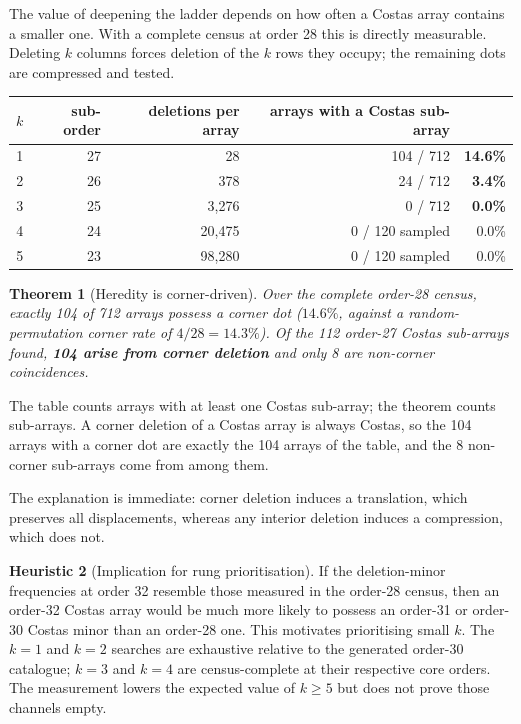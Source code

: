\documentclass[11pt,a4paper,oneside]{report}
\newtheorem{theorem}{Theorem}[chapter]
\theoremstyle{definition}
\newtheorem{heuristic}[theorem]{Heuristic}
\begin{document}
The value of deepening the ladder depends on how often a Costas array contains a
smaller one. With a complete census at order 28 this is directly measurable.
Deleting $k$ columns forces deletion of the $k$ rows they occupy; the remaining
dots are compressed and tested.

\begin{center}
\begin{tabular}{@{}rrrrr@{}}
\toprule
$k$ & sub-order & deletions per array & arrays with a Costas sub-array & \\
\midrule
1 & 27 & 28 & 104 / 712 & \textbf{14.6\%} \\
2 & 26 & 378 & 24 / 712 & \textbf{3.4\%} \\
3 & 25 & 3{,}276 & 0 / 712 & \textbf{0.0\%} \\
4 & 24 & 20{,}475 & 0 / 120 sampled & 0.0\% \\
5 & 23 & 98{,}280 & 0 / 120 sampled & 0.0\% \\
\bottomrule
\end{tabular}
\end{center}

\begin{theorem}[Heredity is corner-driven]
\label{p3-thm:heredity}
Over the complete order-28 census, exactly 104 of 712 arrays possess a corner
dot ($14.6\%$, against a random-permutation corner rate of $4/28 = 14.3\%$). Of
the 112 order-27 Costas sub-arrays found, \textbf{104 arise from corner
deletion} and only 8 are non-corner coincidences.
\end{theorem}

\noindent The table counts arrays with at least one Costas sub-array; the theorem counts
sub-arrays. A corner deletion of a Costas array is always Costas, so the 104 arrays with a corner
dot are exactly the 104 arrays of the table, and the 8 non-corner sub-arrays come from among them.

The explanation is immediate: corner deletion induces a translation, which
preserves all displacements, whereas any interior deletion induces a compression,
which does not.

\begin{heuristic}[Implication for rung prioritisation]
\label{p3-cor:ladder-value}
If the deletion-minor frequencies at order 32 resemble those measured in the
order-28 census, then an order-32 Costas array would be much more likely to
possess an order-31 or order-30 Costas minor than an order-28 one. This motivates
prioritising small $k$. The $k=1$ and $k=2$ searches are exhaustive relative to
the generated order-30 catalogue; $k=3$ and $k=4$ are census-complete at their
respective core orders. The measurement lowers the expected value of $k\ge5$ but
does not prove those channels empty.
\end{heuristic}
\end{document}
